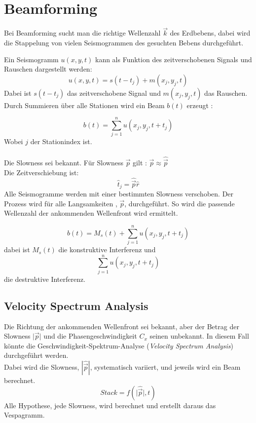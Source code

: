 \chapter{Beamforming}

Bei Beamforming sucht man die richtige Wellenzahl $\vec{k}$ des Erdbebens, dabei wird die Stappelung von vielen Seismogrammen des gesuchten Bebens durchgeführt. 

Ein Seismogramm $u(x,y,t)$ kann als Funktion des zeitverschobenen Signals und Rauschen dargestellt werden:
\begin{equation}
u(x,y,t) = s(t-t_{j})+m(x_{j},y_{j},t)
\end{equation}
 Dabei ist $s(t-t_{j})$ das zeitverschobene Signal und $m(x_{j},y_{j},t)$ das Rauschen.\\
 Durch Summieren über alle Stationen wird ein Beam $b(t)$ erzeugt :
 
\begin{equation}
 b(t) = \sum_{j=1}^{n} u( x_{j},y_{j},t+t_{j})
\end{equation}
{\small Wobei $j$ der Stationindex ist.}\\\\ 
 Die Slowness sei bekannt. Für Slowness $\vec{p}$ gilt : $ \vec{p}\approx \hat{\vec{p}}$\\
 Die Zeitverschiebung ist: 
 \begin{equation}
 \hat{t}_{j}=\hat{\vec{p}}\hat{r}
 \end{equation}
Alle Seismogramme werden mit einer bestimmten Slowness verschoben. Der Prozess wird für alle Langsamkeiten , $\vec{p}$, durchgeführt. So wird die passende Wellenzahl der ankommenden Wellenfront wird ermittelt. 
 

 \begin{equation}
 b(t) = M_{s}(t)+ \sum_{j=1}^{n} u( x_{j},y_{j},t+t_{j})
 \end{equation}
 dabei ist $M_{s}(t)$ die konstruktive Interferenz und
\[
\sum_{j=1}^{n} u( x_{j},y_{j},t+t_{j})
\]
die destruktive Interferenz.

\section{Velocity Spectrum Analysis}
Die Richtung der ankommenden Wellenfront sei bekannt, aber der Betrag der Slowness  $\vert\vec{p}\vert$ und die Phasengeschwindigkeit $C_{x}$ seinen unbekannt.
In diesem Fall könnte die Geschwindigkeit-Spektrum-Analyse (\textit{Velocity Spectrum Analysis}) durchgeführt werden.\\
Dabei wird die Slowness, $|\hat{\vec{p}}|$, systematisch variiert, und jeweils wird ein Beam berechnet.
\[
Stack = f(\vert\hat{\vec{p}}\vert,t)
\]
Alle Hypothese, jede Slowness, wird berechnet und erstellt daraus das Vespagramm. 

